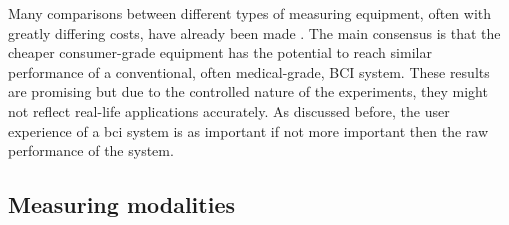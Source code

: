 
Many comparisons between different types of measuring equipment, often with greatly differing costs, have already been made \citep{bci_cheap_viability1, bci_cheap_viability2, bci_cheap_viability3, bci_cheap_viability4, bci_cheap_viability5}.
The main consensus is that the cheaper consumer-grade equipment has the potential to reach similar performance of a conventional, often medical-grade, BCI system.
These results are promising but due to the controlled nature of the experiments, they might not reflect real-life applications accurately.
As discussed before, the user experience of a \gls{bci} system is as important if not more important then the raw performance of the system.


\subsection{Measuring modalities}
\label{subsec:biomedical_signals_measuring_modalities}



